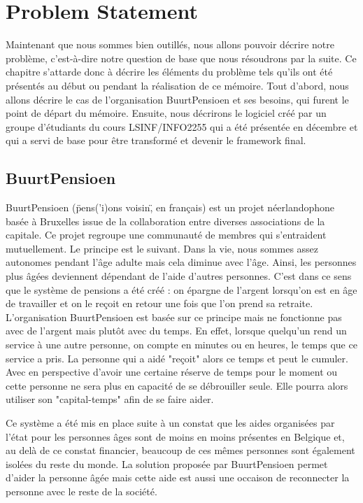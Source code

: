 \section{Problem Statement}

Maintenant que nous sommes bien outillés,  nous allons pouvoir décrire notre problème,  c'est-à-dire notre question de base que nous résoudrons par la suite.  Ce chapitre s'attarde donc à décrire les éléments du problème tels qu'ils ont été présentés au début ou pendant la réalisation de ce mémoire.  Tout d'abord,  nous allons décrire le cas de l'organisation BuurtPensioen et ses besoins,  qui furent le point de départ du mémoire.  Ensuite,  nous décrirons le logiciel créé par un groupe d'étudiants du cours LSINF/INFO2255 qui a été présentée en décembre et qui a servi de base pour être transformé et devenir le framework final.

\subsection{BuurtPensioen}

BuurtPensioen \cite{buurtpensioen} (\"pens('i)ons voisin\",  en français) est un projet néerlandophone basée à Bruxelles issue de la collaboration entre diverses associations de la capitale.  Ce projet regroupe une communauté de membres qui s'entraident mutuellement.  Le principe est le suivant.  Dans la vie,  nous sommes assez autonomes pendant l'âge adulte mais cela diminue avec l'âge.  Ainsi,  les personnes plus âgées deviennent dépendant de l'aide d'autres personnes.  C'est dans ce sens que le système de pensions a été créé : on épargne de l'argent lorsqu'on est en âge de travailler et on le reçoit en retour une fois que l'on prend sa retraite.  L'organisation BuurtPensioen est basée sur ce principe mais ne fonctionne pas avec de l'argent mais plutôt avec du temps.  En effet,  lorsque quelqu'un rend un service à une autre personne,  on compte en minutes ou en heures,  le temps que ce service a pris.  La personne qui a aidé "reçoit" alors ce temps et peut le cumuler.  Avec en perspective d'avoir une certaine réserve de temps pour le moment ou cette personne ne sera plus en capacité de se débrouiller seule.  Elle pourra alors utiliser son "capital-temps" afin de se faire aider.

Ce système a été mis en place suite à un constat que les aides organisées par l'état pour les personnes âges sont de moins en moins présentes en Belgique et,  au delà de ce constat financier,  beaucoup de ces mêmes personnes sont également isolées du reste du monde.  La solution proposée par BuurtPensioen permet d'aider la personne âgée mais cette aide est aussi une occaison de reconnecter la personne avec le reste de la société.   


